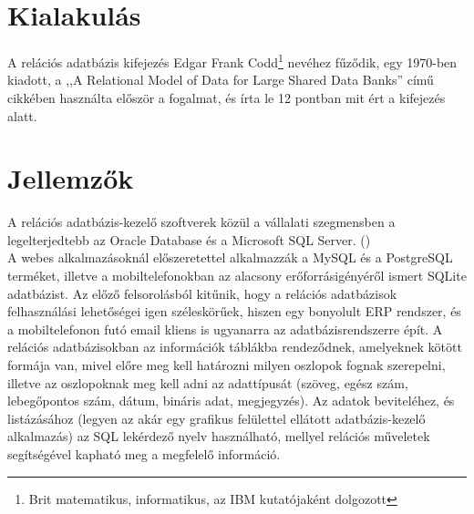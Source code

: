 \section{Kialakulás}
A relációs adatbázis kifejezés Edgar Frank Codd\footnote{Brit matematikus, informatikus, az IBM kutatójaként dolgozott} nevéhez fűződik, egy 1970-ben kiadott, a ,,A Relational Model of Data for Large Shared Data Banks'' című cikkében használta először a fogalmat, és írta le 12 pontban mit ért a kifejezés alatt. 

\section{Jellemzők}

A relációs adatbázis-kezelő szoftverek közül a vállalati szegmensben a legelterjedtebb az Oracle Database és a Microsoft SQL Server. (\cite{rdbms_stat})\\ A webes alkalmazásoknál előszeretettel alkalmazzák a MySQL és  a PostgreSQL terméket, illetve a mobiltelefonokban az alacsony erőforrásigényéről ismert SQLite adatbázist. Az előző felsorolásból kitűnik, hogy a relációs adatbázisok felhasználási lehetőségei igen széleskörűek, hiszen egy bonyolult ERP rendszer, és a mobiltelefonon futó email kliens is ugyanarra az adatbázisrendszerre épít.
A relációs adatbázisokban az információk táblákba rendeződnek, amelyeknek kötött formája van, mivel előre meg kell határozni milyen oszlopok fognak szerepelni, illetve az oszlopoknak meg kell adni az adattípusát (szöveg, egész szám, lebegőpontos szám, dátum, bináris adat, megjegyzés). Az adatok beviteléhez, és listázásához (legyen az akár egy grafikus felülettel ellátott adatbázis-kezelő alkalmazás) az SQL lekérdező nyelv használható, mellyel relációs műveletek segítségével kapható meg a megfelelő információ.

